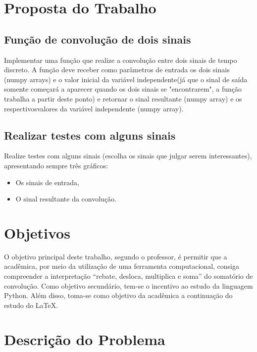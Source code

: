\documentclass[dvipdfm, a4paper, 11pt]{report}
\begin{document}
{\section{Proposta do Trabalho}
\subsection{Função de convolução de dois sinais}
Implementar uma função que realize a convolução entre dois sinais de tempo discreto. A função
deve receber como parâmetros de entrada os dois sinais (numpy arrays) e o valor inicial da
variável independente(já que o sinal de saída somente começará a aparecer quando os dois sinais se "encontrarem", a função trabalha a partir deste ponto) e retornar o sinal resultante (numpy array) e os respectivosvalores da variável independente (numpy array).

\subsection{Realizar testes com alguns sinais}
Realize testes com alguns sinais (escolha os sinais que julgar serem interessantes), apresentando
sempre três gráficos:\\
\begin{itemize}
	\item Os sinais de entrada,
	\item O sinal resultante da convolução.
\end{itemize}
\section{Objetivos}
O objetivo principal deste trabalho, segundo o professor, é permitir que a acadêmica, 
por meio da utilização de uma ferramenta computacional, consiga compreender 
a interpretação “rebate, desloca, multiplica e soma” do somatório de convolução. 
Como objetivo secundário, tem-se o incentivo ao estudo da linguagem Python.
Além disso, toma-se como objetivo da acadêmica a continuação do estudo do \LaTeX.

\section{Descrição do Problema}\label{desc}
}
\end{document}
